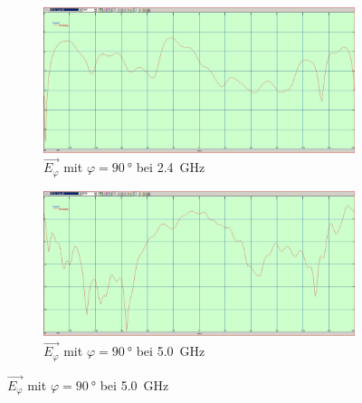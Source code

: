 \begin{figure}[h!]
	\begin{subfigure}[b]{0.48\textwidth}
		\includegraphics[width=1\textwidth]{../fig/plt/2G4_90phi_ephi_amp_dB.JPG}
		\caption{$\vec{E_{\varphi}}$ mit $\varphi=\SI{90}{\degree}$ bei \SI{2.4}{\giga\hertz}}
	\end{subfigure}
	\begin{subfigure}[b]{0.48\textwidth}
		\includegraphics[width=1\textwidth]{../fig/plt/5G0_90phi_ephi_amp_dB.JPG}
		\caption{$\vec{E_{\varphi}}$ mit $\varphi=\SI{90}{\degree}$ bei \SI{5.0}{\giga\hertz}}
	\end{subfigure}


\end{figure}
